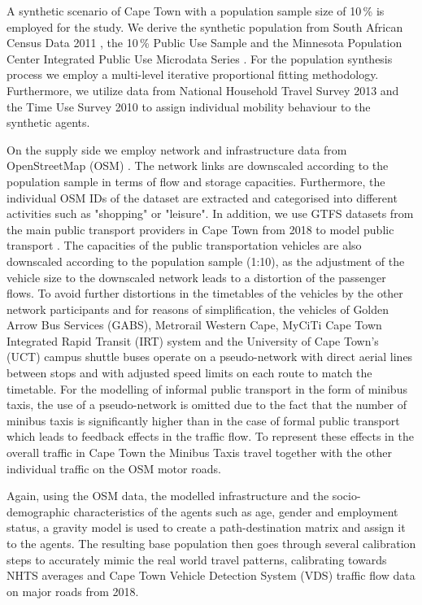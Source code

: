 \documentclass[preprint,12pt,authoryear]{elsarticle}
\newcommand{\absatz}{\par\hspace*{1.5em}\ignorespaces}
\begin{document}
A synthetic scenario of Cape Town with a population sample size of 10\,\% is employed for the study.
We derive the synthetic population from South African Census Data 2011 \citep{census2011}, the 10\,\% Public Use Sample \citep{census2011public10pct} and the Minnesota Population Center Integrated Public Use Microdata Series \citep{mpc2020}.
For the population synthesis process we employ a multi-level iterative proportional fitting methodology.
Furthermore, we utilize data from National Household Travel Survey 2013 \citep{nhts2013} and the Time Use Survey 2010 \citep{tus20NationalHouseholdTravelSurvey13} to assign individual mobility behaviour to the synthetic agents.
\absatz
On the supply side we employ network and infrastructure data from OpenStreetMap (OSM) \citep{osm}.
The network links are downscaled according to the population sample in terms of flow and storage capacities.
Furthermore, the individual OSM IDs of the dataset are extracted and categorised into different activities such as "shopping" or "leisure".
In addition, we use GTFS datasets from the main public transport providers in Cape Town from 2018 to model public transport \citep{transifeeds}.
The capacities of the public transportation vehicles are also downscaled according to the population sample (1:10), as the adjustment of the vehicle size to the downscaled network leads to a distortion of the passenger flows.
To avoid further distortions in the timetables of the vehicles by the other network participants and for reasons of simplification, the vehicles of Golden Arrow Bus Services (GABS), Metrorail Western Cape, MyCiTi Cape Town Integrated Rapid Transit (IRT) system and the University of Cape Town's (UCT) campus shuttle buses operate on a pseudo-network with direct aerial lines between stops and with adjusted speed limits on each route to match the timetable.
For the modelling of informal public transport in the form of minibus taxis, the use of a pseudo-network is omitted due to the fact that the number of minibus taxis is significantly higher than in the case of formal public transport which leads to feedback effects in the traffic flow.
To represent these effects in the overall traffic in Cape Town the Minibus Taxis travel together with the other individual traffic on the OSM motor roads.
\absatz
Again, using the OSM data, the modelled infrastructure and the socio-demographic characteristics of the agents such as age, gender and employment status, a gravity model is used to create a path-destination matrix and assign it to the agents.
The resulting base population then goes through several calibration steps to accurately mimic the real world travel patterns, calibrating towards NHTS averages and Cape Town Vehicle Detection System (VDS) traffic flow data on major roads from 2018.
\end{document}
